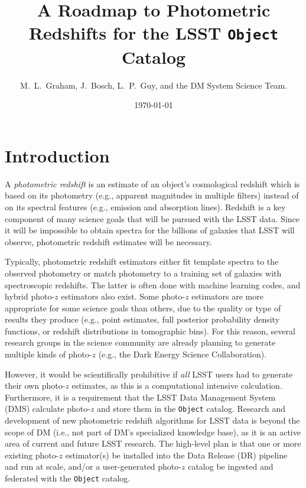 \documentclass[DM,lsstdraft,toc]{lsstdoc}
\title[Photo-$z$ for LSST Objects]{A Roadmap to Photometric Redshifts for the LSST {\tt Object} Catalog}
\author{M.~L.~Graham, J.~Bosch, L.~P.~Guy, and the DM System Science Team.}
\date{\today}
\begin{document}
\maketitle




\section{Introduction} \label{sec:intro}

A {\it photometric redshift} is an estimate of an object's cosmological redshift which is based on its photometry (e.g., apparent magnitudes in multiple filters) instead of on its spectral features (e.g., emission and absorption lines). 
Redshift is a key component of many science goals that will be pursued with the LSST data.
Since it will be impossible to obtain spectra for the billions of galaxies that LSST will observe, photometric redshift estimates will be necessary.

Typically, photometric redshift estimators either fit template spectra to the observed photometry or match photometry to a training set of galaxies with spectroscopic redshifts. 
The latter is often done with machine learning codes, and hybrid photo-$z$ estimators also exist. 
Some photo-$z$ estimators are more appropriate for some science goals than others, due to the quality or type of results they produce (e.g., point estimates, full posterior probability density functions, or redshift distributions in tomographic bins).
For this reason, several research groups in the science community are already planning to generate multiple kinds of photo-$z$ (e.g., the Dark Energy Science Collaboration).

However, it would be scientifically prohibitive if \emph{all} LSST users had to generate their own photo-$z$ estimates, as this is a computational intensive calculation.
Furthermore, it is a requirement that the LSST Data Management System (DMS) calculate photo-$z$ and store them in the {\tt Object} catalog.
Research and development of new photometric redshift algorithms for LSST data is beyond the scope of DM (i.e., not part of DM's specialized knowledge base), as it is an active area of current and future LSST research.
The high-level plan is that one or more existing photo-$z$ estimator(s) be installed into the Data Release (DR) pipeline and run at scale, and/or a user-generated photo-$z$ catalog be ingested and federated with the {\tt Object} catalog.
\end{document}
